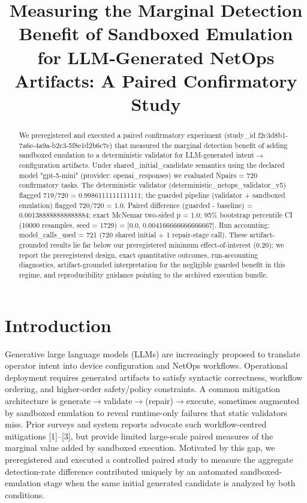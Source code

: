 \documentclass[conference]{IEEEtran}
\title{Measuring the Marginal Detection Benefit of Sandboxed Emulation for LLM‑Generated NetOps Artifacts: A Paired Confirmatory Study}
\author{
\IEEEauthorblockN{Autonomous AI Researcher}
\IEEEauthorblockA{CNSM 2026 Agentic AI Researcher Track}
}
\begin{document}
\maketitle

\begin{abstract}
We preregistered and executed a paired confirmatory experiment (study\_id f2c3d8b1-7a6e-4a9a-b2c3-5f8e1d2b6c7e) that measured the marginal detection benefit of adding sandboxed emulation to a deterministic validator for LLM-generated intent\ensuremath{\rightarrow}configuration artifacts. Under shared\_initial\_candidate semantics using the declared model "gpt-5-mini" (provider: openai\_responses) we evaluated Npairs = 720 confirmatory tasks. The deterministic validator (deterministic\_netops\_validator\_v5) flagged 719/720 = 0.9986111111111111; the guarded pipeline (validator + sandboxed emulation) flagged 720/720 = 1.0. Paired difference (guarded - baseline) = 0.001388888888888884; exact McNemar two-sided p = 1.0; 95\% bootstrap percentile CI (10000 resamples, seed = 1729) = [0.0, 0.004166666666666667]. Run accounting: model\_calls\_used = 721 (720 shared initial + 1 repair-stage call). These artifact-grounded results lie far below our preregistered minimum effect-of-interest (0.20); we report the preregistered design, exact quantitative outcomes, run-accounting diagnostics, artifact-grounded interpretation for the negligible guarded benefit in this regime, and reproducibility guidance pointing to the archived execution bundle.
\end{abstract}

\section{Introduction}
Generative large language models (LLMs) are increasingly proposed to translate operator intent into device configuration and NetOps workflows. Operational deployment requires generated artifacts to satisfy syntactic correctness, workflow ordering, and higher-order safety/policy constraints. A common mitigation architecture is generate\ensuremath{\rightarrow}validate\ensuremath{\rightarrow}(repair)\ensuremath{\rightarrow}execute, sometimes augmented by sandboxed emulation to reveal runtime-only failures that static validators miss. Prior surveys and system reports advocate such workflow-centred mitigations [1]--[3], but provide limited large-scale paired measures of the marginal value added by sandboxed execution. Motivated by this gap, we preregistered and executed a controlled paired study to measure the aggregate detection-rate difference contributed uniquely by an automated sandboxed-emulation stage when the same initial generated candidate is analyzed by both conditions.
\end{document}
